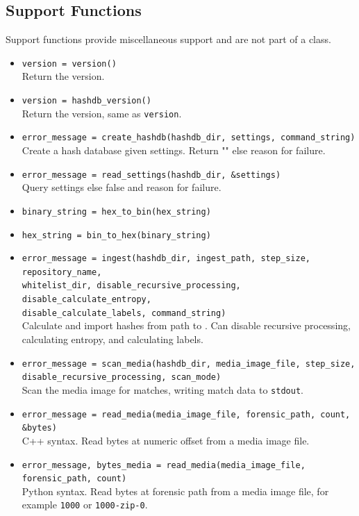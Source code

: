 \documentclass[11pt,fleqn]{article} %
\begin{document}
\subsection{Support Functions}
Support functions provide miscellaneous support and are not part of a class.
\begin{itemize}
\item \verb+version = version()+\\
Return the \hdb version.
\item \verb+version = hashdb_version()+\\
Return the \hdb version, same as \verb+version+.
\item \verb+error_message = create_hashdb(hashdb_dir, settings, command_string)+\\
Create a hash database given settings. Return "" else reason for failure.
\item \verb+error_message = read_settings(hashdb_dir, &settings)+\\
Query settings else false and reason for failure.
\item \verb+binary_string = hex_to_bin(hex_string)+
\item \verb+hex_string = bin_to_hex(binary_string)+
\item \verb+error_message = ingest(hashdb_dir, ingest_path, step_size, repository_name,+\\
\verb+whitelist_dir, disable_recursive_processing, disable_calculate_entropy,+\\
\verb+disable_calculate_labels, command_string)+\\
Calculate and import hashes from path to \hdb. Can disable recursive processing, calculating entropy, and calculating labels.
\item \verb+error_message = scan_media(hashdb_dir, media_image_file, step_size,+\\
\verb+disable_recursive_processing, scan_mode)+\\
Scan the media image for matches, writing match data to \verb+stdout+.
\item \verb+error_message = read_media(media_image_file, forensic_path, count, &bytes)+\\
C++ syntax.  Read bytes at numeric offset from a media image file.
\item \verb+error_message, bytes_media = read_media(media_image_file, forensic_path, count)+\\
Python syntax. Read bytes at forensic path from a media image file, for example \verb+1000+ or \verb+1000-zip-0+.

\end{itemize}
\end{document}
